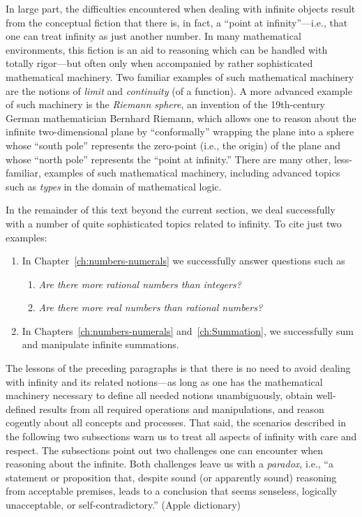 In large part, the difficulties encountered when dealing with infinite
objects result from the conceptual fiction that there is, in fact, a
``point at infinity''---i.e., that one can treat infinity as just
another number.  In many mathematical environments, this fiction is an
aid to reasoning which can be handled with totally rigor---but often
only when accompanied by rather sophisticated mathematical machinery.
Two familiar examples of such mathematical machinery are the notions
of  {\it limit} and  {\it continuity}
(of a function).  A more advanced example of such machinery is the
{\it Riemann sphere},  an invention of the
19th-century German mathematician Bernhard Riemann,  which allows one to reason about the infinite
two-dimensional plane by ``conformally'' wrapping the plane into a
sphere whose ``south pole'' represents the zero-point (i.e., the
origin) of the plane and whose ``north pole'' represents the ``point
at infinity.''  There are many other, less-familiar, examples of such
mathematical machinery, including advanced topics such as {\it types}
in the domain of mathematical logic.

In the remainder of this text beyond the current section, we deal
successfully with a number of quite sophisticated topics related to
infinity.  To cite just two examples:
\begin{enumerate}
\item
In Chapter~\ref{ch:numbers-numerals} we successfully answer questions
such as
  \begin{enumerate}
  \item
{\it Are there more rational numbers than integers?}
  \item
{\it Are there more real numbers than rational numbers?}
  \end{enumerate}

\item
In Chapters~\ref{ch:numbers-numerals} and~\ref{ch:Summation}, we
successfully sum and manipulate infinite summations.
\end{enumerate}

The lessons of the preceding paragraphs is that there is no need to
avoid dealing with infinity and its related notions---as long as one
has the mathematical machinery necessary to define all needed notions
unambiguously, obtain well-defined results from all required
operations and manipulations, and reason cogently about all concepts
and processes.  That said, the scenarios described in the following
two subsections warn us to treat all aspects of infinity with care and
respect.  The subsections point out two challenges one can encounter
when reasoning about the infinite.  Both challenges leave us with a
{\em paradox}, i.e., ``a statement or proposition that, despite sound
(or apparently sound) reasoning from acceptable premises, leads to a
conclusion that seems senseless, logically unacceptable, or
self-contradictory.''  {\small (Apple dictionary)}


